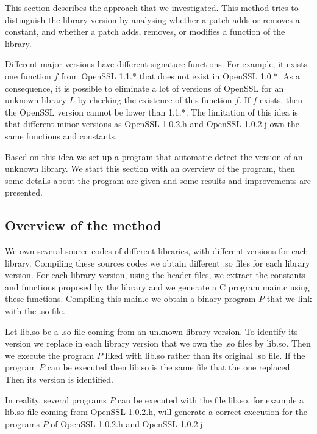 \documentclass{article}
\begin{document}
	This section describes the approach that we investigated. This method tries to distinguish the library version by analysing whether a patch adds or removes a constant, and whether a patch adds, removes, or modifies a function of the library.
	   
    Different major versions have different signature functions. For example, it exists one function $f$ from OpenSSL 1.1.* that does not exist in OpenSSL 1.0.*. As a consequence, it is possible to eliminate a lot of versions of OpenSSL for an unknown library $L$ by checking the existence of this function $f$. If $f$ exists, then the OpenSSL version cannot be lower than 1.1.*. The limitation of this idea is that different minor versions as OpenSSL 1.0.2.h and OpenSSL 1.0.2.j own the same functions and constants.
   
Based on this idea we set up a program that automatic detect the version of an unknown library. We start this section with an overview of the program, then some details about the program are given and some results and improvements are presented.

	\subsection{Overview of the method}
   

	
	We own several source codes of different libraries, with different versions for each library. Compiling these sources codes we obtain different .so files for each library version. 
	For each library version, using the header files, we extract the constants and functions proposed by the library and we generate a C program main.c using these functions. Compiling this main.c we obtain a binary program $P$ that we link with the .so file.


	Let lib.so be a .so file coming from an unknown library version. To identify its version we replace in each library version that we own the .so files by lib.so. Then we execute the program $P$ liked with lib.so rather than its original .so file.
 If the program $P$ can be executed then lib.so is the same file that the one replaced. Then its version is identified.
 
 In reality, several programs $P$ can be executed with the file lib.so, for example a lib.so file coming from OpenSSL 1.0.2.h, will generate a correct execution for the programs $P$ of OpenSSL 1.0.2.h and OpenSSL 1.0.2.j.

	
		
\end{document}
